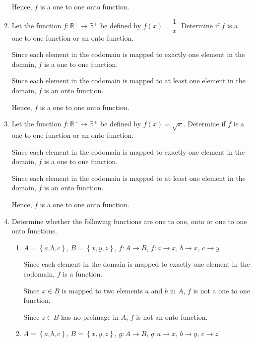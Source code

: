 \documentclass[12pt]{report}
\begin{document}
\begin{enumerate}
        Hence, $f$ is a one to one onto function. \newpage

  \item Let the function $f: \mathbb{R}^+ \to \mathbb{R}^+$ be defined by $f(x) =
          \dfrac{1}{x}$. Determine if $f$ is a one to one function or an onto function.
        \sol{}

        Since each element in the codomain is mapped to exactly one element in the
        domain, $f$ is a one to one function.

        Since each element in the codomain is mapped to at least one element in the
        domain, $f$ is an onto function.

        Hence, $f$ is a one to one onto function.

  \item Let the function $f: \mathbb{R}^+ \to \mathbb{R}^+$ be defined by $f(x) =
          \sqrt{x}$. Determine if $f$ is a one to one function or an onto function.
        \sol{}

        Since each element in the codomain is mapped to exactly one element in the
        domain, $f$ is a one to one function.

        Since each element in the codomain is mapped to at least one element in the
        domain, $f$ is an onto function.

        Hence, $f$ is a one to one onto function.

  \item Determine whether the following functions are one to one, onto or one to one
        onto functions.
        \begin{enumerate}
          \item $A = \left\{a, b, c\right\}$, $B = \left\{x, y, z\right\}$, $f: A \to
                  B$, $f: a \to x$, $b \to x$, $c \to y$
                \sol{}

                Since each element in the domain is mapped to exactly one element in the
                codomain, $f$ is a function.

                Since $x \in B$ is mapped to two elements $a$ and $b$ in $A$, $f$ is not a one
                to one function.

                Since $z \in B$ has no preimage in $A$, $f$ is not an onto function.

          \item $A = \left\{a, b, c\right\}$, $B = \left\{x, y, z\right\}$, $g: A \to
                  B$, $g: a \to x$, $b \to y$, $c \to z$
                \sol{}


\end{enumerate}
\end{enumerate}
\end{document}

